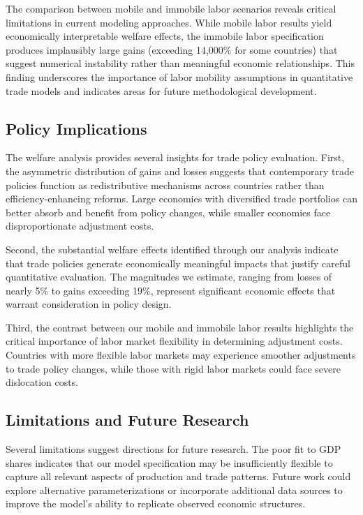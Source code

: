 The comparison between mobile and immobile labor scenarios reveals critical limitations in current modeling approaches. While mobile labor results yield economically interpretable welfare effects, the immobile labor specification produces implausibly large gains (exceeding 14,000\% for some countries) that suggest numerical instability rather than meaningful economic relationships. This finding underscores the importance of labor mobility assumptions in quantitative trade models and indicates areas for future methodological development.

\subsection{Policy Implications}

The welfare analysis provides several insights for trade policy evaluation. First, the asymmetric distribution of gains and losses suggests that contemporary trade policies function as redistributive mechanisms across countries rather than efficiency-enhancing reforms. Large economies with diversified trade portfolios can better absorb and benefit from policy changes, while smaller economies face disproportionate adjustment costs.

Second, the substantial welfare effects identified through our analysis indicate that trade policies generate economically meaningful impacts that justify careful quantitative evaluation. The magnitudes we estimate, ranging from losses of nearly 5\% to gains exceeding 19\%, represent significant economic effects that warrant consideration in policy design.

Third, the contrast between our mobile and immobile labor results highlights the critical importance of labor market flexibility in determining adjustment costs. Countries with more flexible labor markets may experience smoother adjustments to trade policy changes, while those with rigid labor markets could face severe dislocation costs.

\subsection{Limitations and Future Research}

Several limitations suggest directions for future research. The poor fit to GDP shares indicates that our model specification may be insufficiently flexible to capture all relevant aspects of production and trade patterns. Future work could explore alternative parameterizations or incorporate additional data sources to improve the model's ability to replicate observed economic structures.

